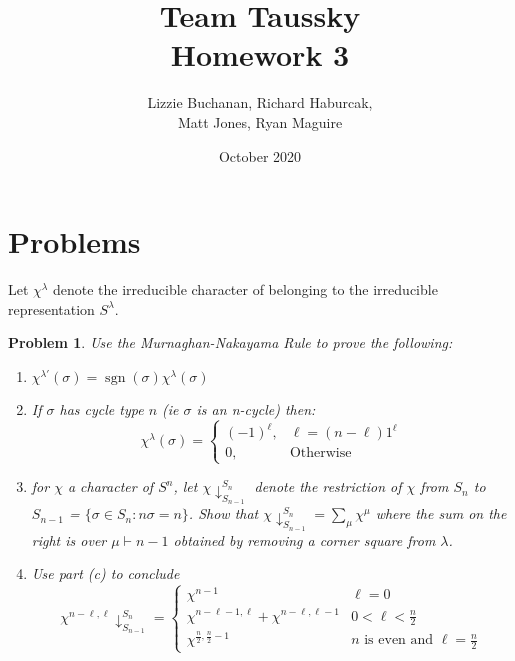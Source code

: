 \documentclass{article}
\title{Team Taussky\\ Homework 3}
\author{Lizzie Buchanan, Richard Haburcak,\\
        Matt Jones, Ryan Maguire}
\date{October 2020}
\def\sgn{\operatorname{sgn}}
\theoremstyle{normal}
\newtheorem{problem}{Problem}
\theoremstyle{thmit}
\begin{document}
\maketitle

\section{Problems}

Let $\chi^\lambda$ denote the irreducible character of belonging to the irreducible representation
$S^\lambda$.
\begin{problem}
    Use the Murnaghan-Nakayama Rule to prove the following:
    \begin{enumerate}[label = (\alph*)]
        \item $\chi^{\lambda'}(\sigma) = \sgn(\sigma)\chi^\lambda(\sigma)$
        \item If $\sigma$ has cycle type $n$ (ie $\sigma$ is an n-cycle) then:
            \begin{equation}
                \chi^\lambda (\sigma)=
                    \begin{cases}
                        (-1)^{\ell},&\ell=(n-\ell)1^{\ell}\\
                        0,&\textrm{Otherwise}
                    \end{cases}
            \end{equation}
        \item for $\chi$ a character of $S^n$, let $\chi\downarrow_{S_{n-1}}^{S_n}$ denote the
              restriction of $\chi$ from $S_n$ to $S_{n-1}$ = $\{\sigma \in S_n : n\sigma = n\}$. Show
              that $\chi\downarrow_{S_{n-1}}^{S_n} = \sum_\mu \chi^\mu$ where the sum on the right is
              over $\mu \vdash n-1$ obtained by removing a corner square from $\lambda$.
        \item Use part (c) to conclude
        \begin{equation}
            \chi^{n-\ell,\ell}\downarrow^{S_n}_{S_{n-1}} = \begin{cases}
            \chi^{n-1} & \ell = 0 \\
            \chi^{n-\ell-1,\ell} + \chi^{n-\ell,\ell-1} & 0<\ell<\frac{n}{2}\\
            \chi^{\frac{n}{2},\frac{n}{2}-1} & n \textrm{ is even and } \ell=\frac{n}{2}
            \end{cases}
        \end{equation}
    \end{enumerate}
\end{problem}
\end{document}
